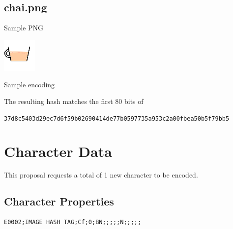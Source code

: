 \documentclass[12pt]{article}
\begin{document}


\subsection{chai.png}

Sample PNG

\includegraphics{chai.png}

Sample encoding



%


The resulting hash matches the first 80 bits of 

\small{\texttt{37d8c5403d29ec7d6f59b02690414de77b0597735a953c2a00fbea50b5f79bb5}}

\section{Character Data}

This proposal requests a total of 1 new character to be encoded.

\subsection{Character Properties}

\begin{verbatim}
E0002;IMAGE HASH TAG;Cf;0;BN;;;;;N;;;;;
\end{verbatim}


%
\end{document}
